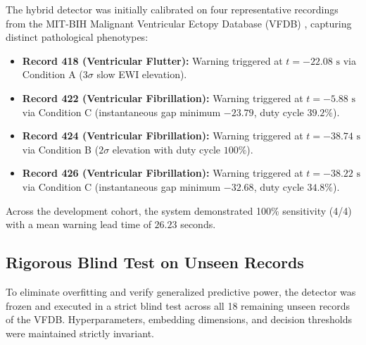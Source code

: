 \documentclass[11pt,a4paper]{article}
\begin{document}
The hybrid detector was initially calibrated on four representative recordings from the MIT-BIH Malignant Ventricular Ectopy Database (VFDB) \cite{Goldberger2000}, capturing distinct pathological phenotypes:
\begin{itemize}
    \item \textbf{Record 418 (Ventricular Flutter):} Warning triggered at $t = -22.08\text{ s}$ via Condition A ($3\sigma$ slow EWI elevation).
    \item \textbf{Record 422 (Ventricular Fibrillation):} Warning triggered at $t = -5.88\text{ s}$ via Condition C (instantaneous gap minimum $-23.79$, duty cycle $39.2\%$).
    \item \textbf{Record 424 (Ventricular Fibrillation):} Warning triggered at $t = -38.74\text{ s}$ via Condition B ($2\sigma$ elevation with duty cycle $100\%$).
    \item \textbf{Record 426 (Ventricular Fibrillation):} Warning triggered at $t = -38.22\text{ s}$ via Condition C (instantaneous gap minimum $-32.68$, duty cycle $34.8\%$).
\end{itemize}
Across the development cohort, the system demonstrated 100\% sensitivity (4/4) with a mean warning lead time of $26.23$ seconds.

\subsection{Rigorous Blind Test on Unseen Records}

To eliminate overfitting and verify generalized predictive power, the detector was frozen and executed in a strict blind test across all 18 remaining unseen records of the VFDB. Hyperparameters, embedding dimensions, and decision thresholds were maintained strictly invariant.
\end{document}
